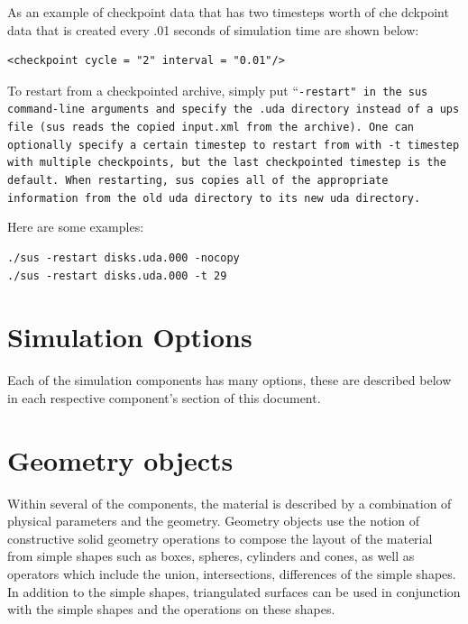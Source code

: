 As an example of checkpoint data that has two timesteps worth of
che dckpoint data that is created every .01 seconds of simulation time
are shown below:

\begin{Verbatim}[fontsize=\footnotesize]
<checkpoint cycle = "2" interval = "0.01"/>
\end{Verbatim}

To restart from a checkpointed archive, simply put ``\tt -restart\normalfont" in the
sus command-line arguments and specify the .uda directory instead of
a ups file (sus reads the copied \tt input.xml \normalfont from the
archive).  One can optionally specify a certain timestep to restart
from with \tt -t timestep \normalfont with multiple checkpoints, but the
last checkpointed timestep is the default.  When restarting, sus
copies all of the appropriate information from the old uda directory to its
new uda directory.

Here are some examples:

\begin{Verbatim}[fontsize=\footnotesize]
./sus -restart disks.uda.000 -nocopy
./sus -restart disks.uda.000 -t 29
\end{Verbatim}
%

\section{Simulation Options} \label{Sec:SimulationOptions}

Each of the simulation components has many options, these are described
below in each respective component's section of this document.

\section{Geometry objects} \label{Sec:GeometryObjects}

Within several of the components, the material is described by a
combination of physical parameters and the geometry.  Geometry objects
use the notion of constructive solid geometry operations to compose
the layout of the material from simple shapes such as boxes, spheres,
cylinders and cones, as well as operators which include the union,
intersections, differences of the simple shapes.  In addition to the
simple shapes, triangulated surfaces can be used in conjunction with
the simple shapes and the operations on these shapes.

